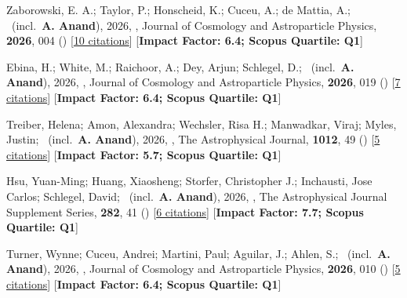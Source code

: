 \item[{\color{numcolor}\scriptsize32}] Zaborowski, E. A.; Taylor, P.; Honscheid, K.; Cuceu, A.; de Mattia, A.; \etal\ (incl.\ \textbf{A. Anand}), 2026, , Journal of Cosmology and Astroparticle Physics, \textbf{2026}, 004 () [\href{https://ui.adsabs.harvard.edu/abs/2026JCAP...04..004Z}{10 citations}] [\textbf{Impact Factor: 6.4; Scopus Quartile: Q1}]

\item[{\color{numcolor}\scriptsize31}] Ebina, H.; White, M.; Raichoor, A.; Dey, Arjun; Schlegel, D.; \etal\ (incl.\ \textbf{A. Anand}), 2026, , Journal of Cosmology and Astroparticle Physics, \textbf{2026}, 019 () [\href{https://ui.adsabs.harvard.edu/abs/2026JCAP...03..019E}{7 citations}] [\textbf{Impact Factor: 6.4; Scopus Quartile: Q1}]

\item[{\color{numcolor}\scriptsize30}] Treiber, Helena; Amon, Alexandra; Wechsler, Risa H.; Manwadkar, Viraj; Myles, Justin; \etal\ (incl.\ \textbf{A. Anand}), 2026, , The Astrophysical Journal, \textbf{1012}, 49 () [\href{https://ui.adsabs.harvard.edu/abs/2026ApJ..1012...49T}{5 citations}] [\textbf{Impact Factor: 5.7; Scopus Quartile: Q1}]

\item[{\color{numcolor}\scriptsize29}] Hsu, Yuan-Ming; Huang, Xiaosheng; Storfer, Christopher J.; Inchausti, Jose Carlos; Schlegel, David; \etal\ (incl.\ \textbf{A. Anand}), 2026, , The Astrophysical Journal Supplement Series, \textbf{282}, 41 () [\href{https://ui.adsabs.harvard.edu/abs/2026ApJS..282...41H}{6 citations}] [\textbf{Impact Factor: 7.7; Scopus Quartile: Q1}]

\item[{\color{numcolor}\scriptsize28}] Turner, Wynne; Cuceu, Andrei; Martini, Paul; Aguilar, J.; Ahlen, S.; \etal\ (incl.\ \textbf{A. Anand}), 2026, , Journal of Cosmology and Astroparticle Physics, \textbf{2026}, 010 () [\href{https://ui.adsabs.harvard.edu/abs/2026JCAP...05..010T}{5 citations}] [\textbf{Impact Factor: 6.4; Scopus Quartile: Q1}]

